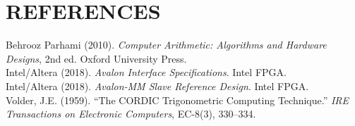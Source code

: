 \documentclass[12pt,a4paper]{article}
\begin{document}
\newpage


\newpage
\section*{REFERENCES}

\noindent Behrooz Parhami (2010). \textit{Computer Arithmetic: Algorithms and Hardware Designs}, 2nd ed. Oxford University Press.\\
\noindent Intel/Altera (2018). \textit{Avalon Interface Specifications}. Intel FPGA.\\
\noindent Intel/Altera (2018). \textit{Avalon-MM Slave Reference Design}. Intel FPGA.\\
\noindent Volder, J.E. (1959). ``The CORDIC Trigonometric Computing Technique.'' \textit{IRE Transactions on Electronic Computers}, EC-8(3), 330--334.
\end{document}
